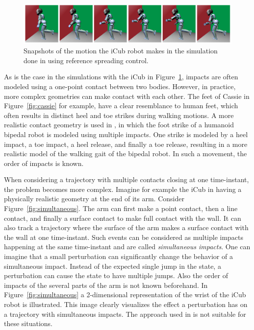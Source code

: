 \documentclass[../DC2017114Bouma.tex]{subfiles}
\begin{document}
\begin{figure}[bt!]
\centering
\includegraphics[width=\textwidth]{rijnen2017.PNG}\caption{Snapshots of the motion the iCub robot makes in the simulation done in \cite{Rijnen2017a} using reference spreading control.}\label{fig:rijnen2017}
\end{figure}

As is the case in the simulations with the iCub in Figure~\ref{fig:rijnen2017}, impacts are often modeled using a one-point contact between two bodies. However, in practice, more complex geometries can make contact with each other. The feet of Cassie in Figure~\ref{fig:cassie} for example, have a clear resemblance to human feet, which often results in distinct heel and toe strikes during walking motions. A more realistic contact geometry is used in \cite{Zhao2015}, in which the foot strike of a humanoid bipedal robot is modeled using multiple impacts. One strike is modeled by a heel impact, a toe impact, a heel release, and finally a toe release, resulting in a more realistic model of the walking gait of the bipedal robot. In such a movement, the order of impacts is known.

When considering a trajectory with multiple contacts closing at one time-instant, the problem becomes more complex. Imagine for example the iCub in \cite{Rijnen2017a} having a physically realistic geometry at the end of its arm. Consider Figure~\ref{fig:simultaneous}. The arm can first make a point contact, then a line contact, and finally a surface contact to make full contact with the wall. It can also track a trajectory where the surface of the arm makes a surface contact with the wall at one time-instant. Such events can be considered as multiple impacts happening at the same time-instant and are called \textit{simultaneous impacts}. One can imagine that a small perturbation can significantly change the behavior of a simultaneous impact. Instead of the expected single jump in the state, a perturbation can cause the state to have multiple jumps. Also the order of impacts of the several parts of the arm is not known beforehand. In Figure~\ref{fig:simultaneous} a 2-dimensional representation of the wrist of the iCub robot is illustrated. This image clearly visualizes the effect a perturbation has on a trajectory with simultaneous impacts. The approach used in \cite{Zhao2015} is not suitable for these situations.
\end{document}
